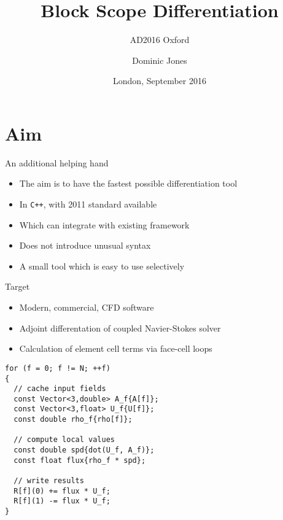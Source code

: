 \documentclass[xcolor=dvipsnames]{beamer}
\title{Block Scope Differentiation}
\subtitle{AD2016 Oxford}
\author{Dominic Jones}
\institute{\texttt{dominic.jones@gmx.co.uk}}
\date{London, September 2016}
\begin{document}
\begin{frame}[plain]
  \titlepage
\end{frame}


\section{Aim}


\begin{frame}{An additional helping hand}
\begin{itemize}
\item The aim is to have the fastest possible differentiation tool \vspace{5mm}
\item In \texttt{C++}, with 2011 standard available \vspace{5mm}
\item Which can integrate with existing framework \vspace{5mm}
\item Does not introduce unusual syntax \vspace{5mm}
\item A small tool which is easy to use selectively \vspace{5mm}
\end{itemize}
\end{frame}

\begin{frame}[fragile]{Target}
\begin{itemize}
\item Modern, commercial, CFD software \vspace{2mm}
\item Adjoint differentation of coupled Navier-Stokes solver \vspace{2mm}
\item Calculation of element cell terms via face-cell loops \vspace{2mm}
\end{itemize}
\begin{lstlisting}
for (f = 0; f != N; ++f)
{
  // cache input fields
  const Vector<3,double> A_f{A[f]};
  const Vector<3,float> U_f{U[f]};
  const double rho_f{rho[f]};

  // compute local values
  const double spd{dot(U_f, A_f)};
  const float flux{rho_f * spd};

  // write results
  R[f](0) += flux * U_f;
  R[f](1) -= flux * U_f;
}
\end{lstlisting}
\end{frame}
\end{document}

